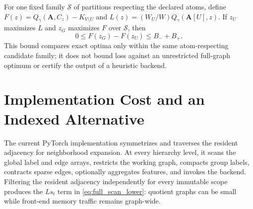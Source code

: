 \documentclass{ieeeaccess}
\begin{document}
For one fixed family $\mathcal{S}$ of partitions respecting the declared
atoms, define $F(z)=Q_\gamma(\bm A,C_z)-K_{V\setminus U}$ and
$L(z)=(W_U/W)Q_\gamma(\bm{A}[U],z)$. If $z_U$ maximizes $L$ and $z_G$
maximizes $F$ over $\mathcal{S}$, then
\begin{equation}
0\le F(z_G)-F(z_U)\le B_-+B_+.
\label{eq:restricted_loss}
\end{equation}
This bound compares exact optima only within the same atom-respecting candidate
family; it does not bound loss against an unrestricted full-graph optimum or
certify the output of a heuristic backend.

\section{Implementation Cost and an Indexed Alternative}
\label{app:implementation_cost}

The current PyTorch implementation symmetrizes and traverses the resident
adjacency for neighborhood expansion. At every hierarchy level, it scans the
global label and edge arrays, restricts the working graph, compacts group
labels, contracts sparse edges, optionally aggregates features, and invokes
the backend. Filtering the resident adjacency independently for every
immutable scope produces the $Ls_t$ term in
\eqref{eq:full_scan_lower}: quotient graphs can be small while front-end memory
traffic remains graph-wide.
\end{document}

